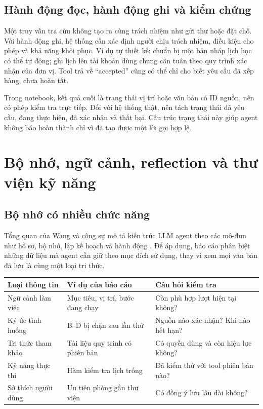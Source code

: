\subsection{Hành động đọc, hành động ghi và kiểm chứng}
Một truy vấn tra cứu không tạo ra cùng trách nhiệm như gửi thư hoặc đặt chỗ. Với hành
động ghi, hệ thống cần xác định người chịu trách nhiệm, điều kiện cho phép và khả năng
khôi phục. Ví dụ tự thiết kế: chuẩn bị một bản nháp lịch học có thể tự động; ghi lịch
lên tài khoản dùng chung cần tuân theo quy trình xác nhận của đơn vị. Tool trả về
``accepted'' cũng có thể chỉ cho biết yêu cầu đã xếp hàng, chưa hoàn tất.

Trong notebook, kết quả cuối là trạng thái vị trí hoặc văn bản có ID nguồn, nên có
phép kiểm tra trực tiếp. Đối với hệ thống thật, nên tách trạng thái đã yêu cầu, đang
thực hiện, đã xác nhận và thất bại. Cấu trúc trạng thái này giúp agent không báo hoàn
thành chỉ vì đã tạo được một lời gọi hợp lệ.

\par
\section{Bộ nhớ, ngữ cảnh, reflection và thư viện kỹ năng}
\subsection{Bộ nhớ có nhiều chức năng}
Tổng quan của Wang và cộng sự mô tả kiến trúc LLM agent theo các mô-đun như hồ sơ,
bộ nhớ, lập kế hoạch và hành động \cite{llmsurvey}. Để áp dụng, báo cáo phân biệt
những dữ liệu mà agent cần giữ theo mục đích sử dụng, thay vì xem mọi văn bản đã lưu
là cùng một loại tri thức.

\begin{center}\small
\begin{tabularx}{\linewidth}{@{}p{2.7cm}XX@{}}\toprule
\textbf{Loại thông tin} & \textbf{Ví dụ của báo cáo} & \textbf{Câu hỏi kiểm tra}\\\midrule
Ngữ cảnh làm việc & Mục tiêu, vị trí, bước đang chạy & Còn phù hợp lượt hiện tại không?\\
Ký ức tình huống & B--D bị chặn sau lần thử & Nguồn nào xác nhận? Khi nào hết hạn?\\
Tri thức tham khảo & Tài liệu quy trình có phiên bản & Có quyền dùng và còn hiệu lực không?\\
Kỹ năng thực thi & Hàm kiểm tra lịch trống & Đã kiểm thử với tool phiên bản nào?\\
Sở thích người dùng & Ưu tiên phòng gần thư viện & Có đồng ý lưu lâu dài không?\\\bottomrule
\end{tabularx}\end{center}


